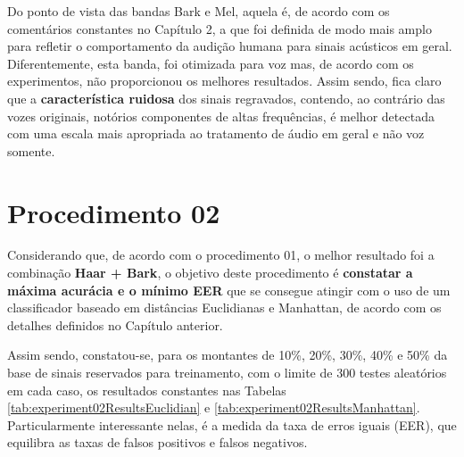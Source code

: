 	\par Do ponto de vista das bandas Bark e Mel, aquela é, de acordo com os comentários constantes no Capítulo 2, a que foi definida de modo mais amplo para refletir o comportamento da audição humana para sinais acústicos em geral. Diferentemente, esta banda, foi otimizada para voz mas, de acordo com os experimentos, não proporcionou os melhores resultados. Assim sendo, fica claro que a \textbf{característica ruidosa} dos sinais regravados, contendo, ao contrário das vozes originais, notórios componentes de altas frequências, é melhor detectada com uma escala mais apropriada ao tratamento de áudio em geral e não voz somente.
	
	\disableClearpage
	
	\section{Procedimento 02} \label{chap:testsResults:sec:Experimento02}
		\enableClearpage
	
		\par Considerando que, de acordo com o procedimento 01, o melhor resultado foi a combinação \textbf{Haar + Bark}, o objetivo deste procedimento é \textbf{constatar a máxima acurácia e o mínimo EER} que se consegue atingir com o uso de um classificador baseado em distâncias Euclidianas e Manhattan, de acordo com os detalhes definidos no Capítulo anterior.\\
		
		\par Assim sendo, constatou-se, para os montantes de 10\%, 20\%, 30\%, 40\% e 50\% da base de sinais reservados para treinamento, com o limite de 300 testes aleatórios em cada caso, os resultados constantes nas Tabelas \ref{tab:experiment02ResultsEuclidian} e \ref{tab:experiment02ResultsManhattan}. Particularmente interessante nelas, é a medida da taxa de erros iguais (EER), que equilibra as taxas de falsos positivos e falsos negativos. \\
		
